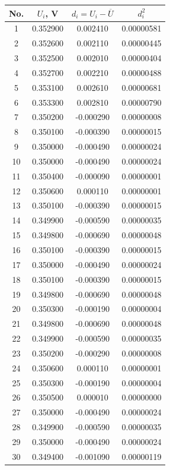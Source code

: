 \begin{tabular}{|c|c|c|c|}
\hline
No. & $U_i$, V & $d_i = U_i - \overline{U}$ & $d_i^2$ \\
\hline
1 & 0.352900 & 0.002410 & 0.00000581 \\
2 & 0.352600 & 0.002110 & 0.00000445 \\
3 & 0.352500 & 0.002010 & 0.00000404 \\
4 & 0.352700 & 0.002210 & 0.00000488 \\
5 & 0.353100 & 0.002610 & 0.00000681 \\
6 & 0.353300 & 0.002810 & 0.00000790 \\
7 & 0.350200 & -0.000290 & 0.00000008 \\
8 & 0.350100 & -0.000390 & 0.00000015 \\
9 & 0.350000 & -0.000490 & 0.00000024 \\
10 & 0.350000 & -0.000490 & 0.00000024 \\
11 & 0.350400 & -0.000090 & 0.00000001 \\
12 & 0.350600 & 0.000110 & 0.00000001 \\
13 & 0.350100 & -0.000390 & 0.00000015 \\
14 & 0.349900 & -0.000590 & 0.00000035 \\
15 & 0.349800 & -0.000690 & 0.00000048 \\
16 & 0.350100 & -0.000390 & 0.00000015 \\
17 & 0.350000 & -0.000490 & 0.00000024 \\
18 & 0.350100 & -0.000390 & 0.00000015 \\
19 & 0.349800 & -0.000690 & 0.00000048 \\
20 & 0.350300 & -0.000190 & 0.00000004 \\
21 & 0.349800 & -0.000690 & 0.00000048 \\
22 & 0.349900 & -0.000590 & 0.00000035 \\
23 & 0.350200 & -0.000290 & 0.00000008 \\
24 & 0.350600 & 0.000110 & 0.00000001 \\
25 & 0.350300 & -0.000190 & 0.00000004 \\
26 & 0.350500 & 0.000010 & 0.00000000 \\
27 & 0.350000 & -0.000490 & 0.00000024 \\
28 & 0.349900 & -0.000590 & 0.00000035 \\
29 & 0.350000 & -0.000490 & 0.00000024 \\
30 & 0.349400 & -0.001090 & 0.00000119 \\

\end{tabular}
